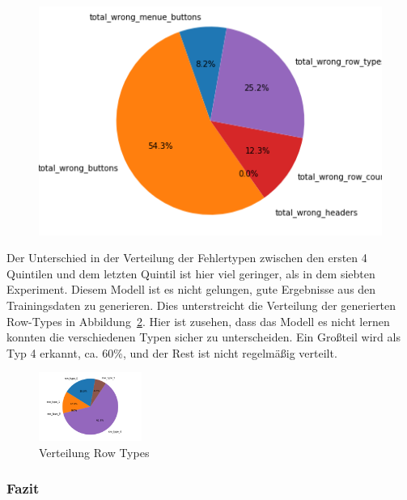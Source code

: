 \documentclass[pdftex,a4paper,halfparskip, article]{scrartcl}
\begin{document}
\begin{figure}
\begin{minipage}{.33\textwidth}
  \label{fig:fehler_beste80_bin12}
\end{minipage}
\begin{minipage}{.33\textwidth}
  \centering
   \includegraphics[width=1\linewidth]{predictions_bin12_p80_error_types_pie_chart}
  \label{fig:fehler_schlechteste20_bin12}
\end{minipage}%
\end{figure}

Der Unterschied in der Verteilung der Fehlertypen zwischen den ersten 4 Quintilen und dem letzten Quintil ist hier viel geringer, als in dem siebten Experiment. Diesem Modell ist es nicht gelungen, gute Ergebnisse aus den Trainingsdaten zu generieren. Dies unterstreicht die Verteilung der generierten Row-Types in Abbildung~\ref{fig:bin12_row_type}. Hier ist zusehen, dass das Modell es nicht lernen konnten die verschiedenen Typen sicher zu unterscheiden. Ein Großteil wird als Typ 4 erkannt, ca. 60\%, und der Rest ist nicht regelmäßig verteilt.

\begin{figure}[h]
\centering
\includegraphics[width=0.3\textwidth]{predictions_bin12_predicted_row_type_distribution}
\caption{Verteilung Row Types}
\label{fig:bin12_row_type}
\end{figure}

\subsubsection*{Fazit}
\end{document}

